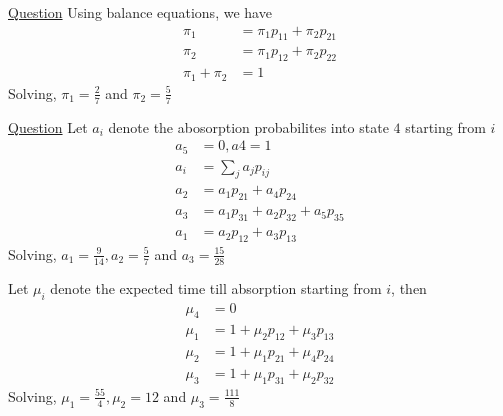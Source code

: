 \documentclass[11pt, a4paper]{article}
\begin{document}
\begin{enumerate}
        \hypertarget{a_steadymarkov}{\item} \hyperlink{q_steadymarkov}{Question}\newline
        Using balance equations, we have
        \begin{align*}
            \pi_{1} &= \pi_{1}p_{11} + \pi_{2}p_{21}\\
            \pi_{2} &= \pi_{1}p_{12} + \pi_{2}p_{22}\\
            \pi_{1} + \pi_{2} &= 1
        \end{align*}
        Solving, $\pi_{1} = \frac{2}{7}$ and $\pi_{2} = \frac{5}{7}$

        \hypertarget{a_absorbmarkov}{\item} \hyperlink{q_absorbmarkov}{Question}\newline
        Let $a_{i}$ denote the abosorption probabilites into state $4$ starting from $i$
        \begin{align*}
            a_{5} &= 0, a{4} = 1 \\
            a_{i} &= \sum_{j} a_{j}p_{ij}\\
            a_{2} &= a_{1}p_{21} + a_{4}p_{24}\\
            a_{3} &= a_{1}p_{31} + a_{2}p_{32} + a_{5}p_{35}\\
            a_{1} &= a_{2}p_{12} + a_{3}p_{13}
        \end{align*}
        Solving, $a_{1} = \frac{9}{14}, a_{2} = \frac{5}{7}$ and $a_{3} = \frac{15}{28}$ \newline
        
        Let $\mu_{i}$ denote the expected time till absorption starting from $i$, then
        \begin{align*}
            \mu_{4} &= 0 \\
            \mu_{1} &= 1 + \mu_{2}p_{12} + \mu_{3}p_{13} \\
            \mu_{2} &= 1 + \mu_{1}p_{21} + \mu_{4}p_{24} \\
            \mu_{3} &= 1 + \mu_{1}p_{31} + \mu_{2}p_{32}
        \end{align*}
        Solving, $\mu_{1} = \frac{55}{4}, \mu_{2} = 12$ and $\mu_{3} = \frac{111}{8}$



\end{enumerate}
\end{document}
